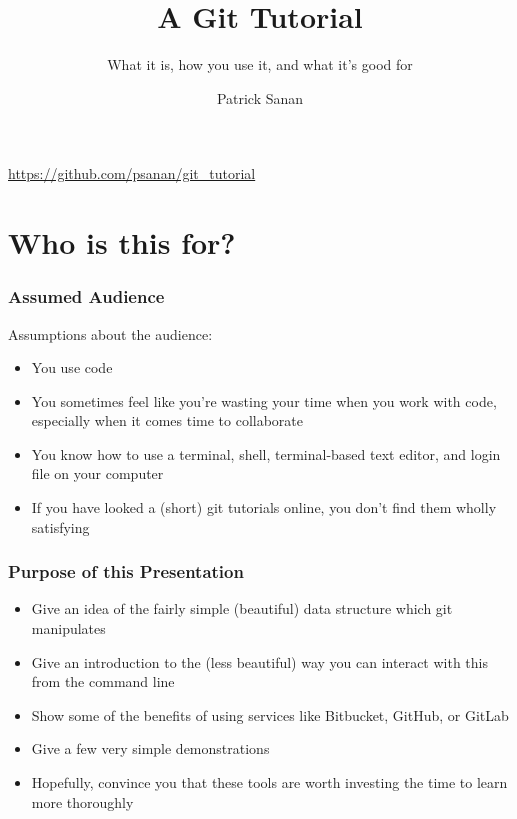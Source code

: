 \documentclass{beamer}
\author{Patrick Sanan}
\institute[ETHZ]
{
ETH Zurich\\
\href{mailto:patrick.sanan@erdw.ethz.ch}{patrick.sanan@erdw.ethz.ch}
}
\title{A Git Tutorial}
\subtitle[]{What it is, how you use it, and what it's good for}
\date[]{}
\begin{document}

\begin{frame}[fragile]
\titlepage
\begin{center}
\href{https://github.com/psanan/git_tutorial}{https://github.com/psanan/git\_tutorial}
\end{center}
\end{frame}


\begin{frame}
\tableofcontents
\end{frame}

\section{Who is this for?}
\begin{frame}[fragile]
\frametitle{Assumed Audience}
Assumptions about the audience:
\begin{itemize}
\item You use code
\item You sometimes feel like you're wasting your time when you work with code, especially when it comes time to collaborate
\item You know how to use a terminal, shell, terminal-based text editor, and login file on your computer
\item If you have looked a (short) git tutorials online, you don't find them wholly satisfying
\end{itemize}
\end{frame}

\begin{frame}[fragile]
\frametitle{Purpose of this Presentation}
\begin{itemize}
\item Give an idea of the fairly simple (beautiful) data structure which git manipulates
\item Give an introduction to the (less beautiful) way you can interact with this from the command line
\item Show some of the benefits of using services like Bitbucket, GitHub, or GitLab
\item Give a few very simple demonstrations
\item Hopefully, convince you that these tools are worth investing the time to learn more thoroughly
\end{itemize}
\end{frame}
\end{document}
